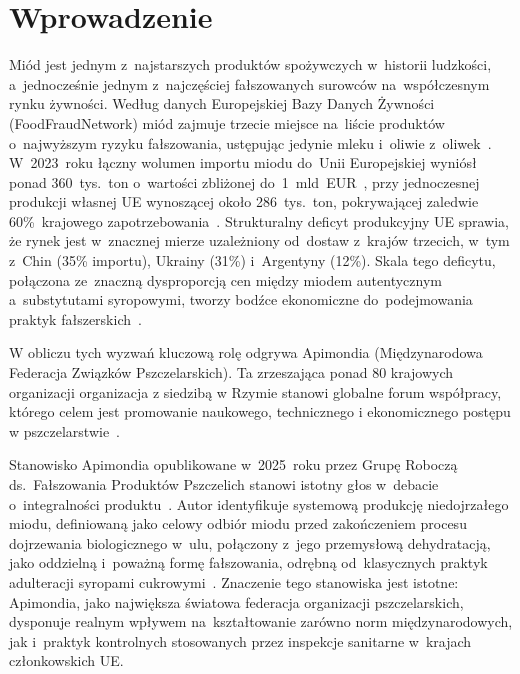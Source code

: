 
\section{Wprowadzenie}

Miód jest jednym z~najstarszych produktów spożywczych w~historii
ludzkości, a~jednocześnie jednym z~najczęściej fałszowanych surowców
na~współczesnym rynku żywności. Według danych Europejskiej Bazy Danych
Żywności (FoodFraudNetwork) miód zajmuje trzecie miejsce na~liście
produktów o~najwyższym ryzyku fałszowania, ustępując jedynie mleku
i~oliwie z~oliwek~\cite{apimondia_fraud_v2}. W~2023~roku łączny
wolumen importu miodu do~Unii Europejskiej wyniósł ponad 360~tys.~ton
o~wartości zbliżonej do~1~mld~EUR~\cite{cbi2024}, przy jednoczesnej
produkcji własnej UE wynoszącej około 286~tys.~ton, pokrywającej
zaledwie 60\%~krajowego zapotrzebowania~\cite{pollinatorhub2025}.
Strukturalny deficyt produkcyjny UE sprawia, że rynek jest w~znacznej
mierze uzależniony od~dostaw z~krajów trzecich, w~tym z~Chin (35\%
importu), Ukrainy (31\%) i~Argentyny (12\%).
Skala tego deficytu, połączona ze~znaczną dysproporcją cen między
miodem autentycznym a~substytutami syropowymi, tworzy  bodźce ekonomiczne do~podejmowania praktyk fałszerskich~\cite{apimondia_fraud_v2}.

W obliczu tych wyzwań kluczową rolę odgrywa Apimondia (Międzynarodowa Federacja Związków Pszczelarskich). Ta zrzeszająca ponad 80 krajowych organizacji organizacja z siedzibą w Rzymie stanowi globalne forum współpracy, którego celem jest promowanie naukowego, technicznego i ekonomicznego postępu w pszczelarstwie~\cite{apimondia_web}.

Stanowisko Apimondia opublikowane w~2025~roku przez Grupę Roboczą ds.~Fałszowania Produktów Pszczelich stanowi
istotny głos w~debacie o~integralności produktu~\cite{garcia2025}.
Autor identyfikuje systemową produkcję niedojrzałego miodu, definiowaną jako celowy odbiór miodu przed zakończeniem procesu
dojrzewania biologicznego w~ulu, połączony z~jego przemysłową dehydratacją, jako oddzielną i~poważną formę fałszowania, odrębną
od~klasycznych praktyk adulteracji syropami cukrowymi~\cite{garcia2025}.
Znaczenie tego stanowiska jest istotne: Apimondia, jako największa światowa federacja organizacji pszczelarskich,
dysponuje realnym wpływem na~kształtowanie zarówno norm międzynarodowych, jak i~praktyk kontrolnych stosowanych przez
inspekcje sanitarne w~krajach członkowskich UE.

